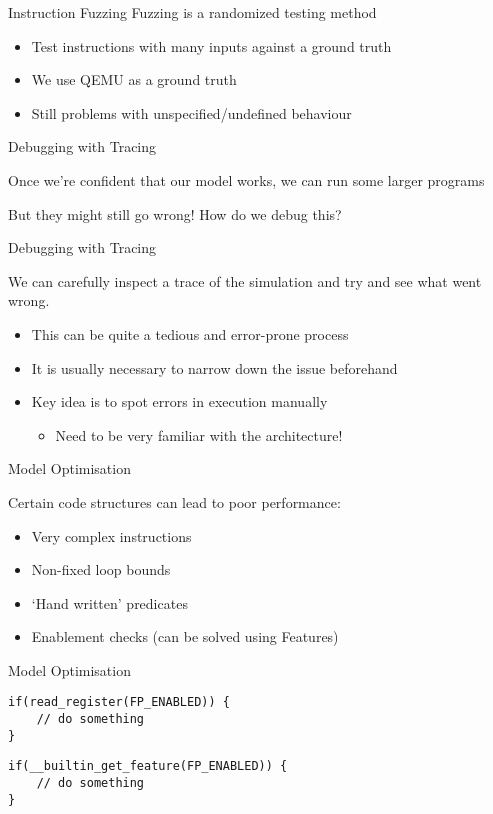 \begin{frame}{Instruction Fuzzing}
Fuzzing is a randomized testing method

\begin{itemize}
\item<2-> Test instructions with many inputs against a ground truth
\item<3-> We use QEMU as a ground truth
\item<4-> \alert{Still problems with unspecified/undefined behaviour}
\end{itemize}



\end{frame}

\begin{frame}{Debugging with Tracing}

Once we're confident that our model works, we can run some larger programs

\pause

But they might still go wrong! How do we debug this?

\end{frame}


\begin{frame}{Debugging with Tracing}

We can carefully inspect a trace of the simulation and try and see
what went wrong.
\begin{itemize}
\item This can be quite a tedious and error-prone process
\item It is usually necessary to narrow down the issue beforehand
\item Key idea is to spot errors in execution manually
\begin{itemize}
\item Need to be very familiar with the architecture!
\end{itemize}
\end{itemize}

\end{frame}

\begin{frame}{Model Optimisation}

Certain code structures can lead to poor performance:
\begin{itemize}
\item Very complex instructions
\item Non-fixed loop bounds
\item `Hand written' predicates
\item Enablement checks (can be solved using Features)
\end{itemize} 

\end{frame}

\begin{frame}[fragile]{Model Optimisation}
\begin{lstlisting}
if(read_register(FP_ENABLED)) {
	// do something
}
\end{lstlisting}

\begin{lstlisting}
if(__builtin_get_feature(FP_ENABLED)) {
	// do something
}
\end{lstlisting}

\end{frame}
